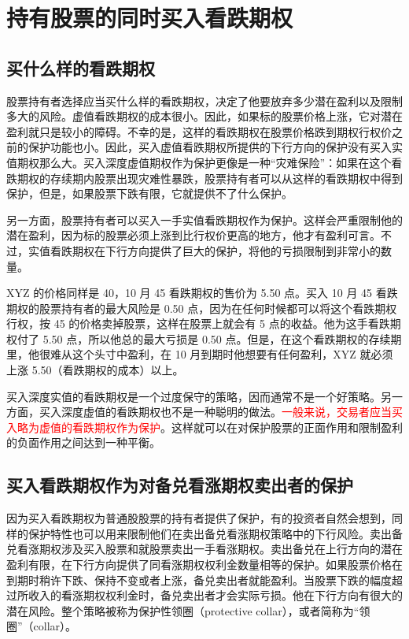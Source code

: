 \chapter{持有股票的同时买入看跌期权\label{CH17}}
\section{买什么样的看跌期权}
股票持有者选择应当买什么样的看跌期权，决定了他要放弃多少潜在盈利以及限制多大的风险。虚值看跌期权的成本很小。因此，如果标的股票价格上涨，它对潜在盈利就只是较小的障碍。不幸的是，这样的看跌期权在股票价格跌到期权行权价之前的保护功能也小。因此，买入虚值看跌期权所提供的下行方向的保护没有买入实值期权那么大。买入深度虚值期权作为保护更像是一种“灾难保险”：如果在这个看跌期权的存续期内股票出现灾难性暴跌，股票持有者可以从这样的看跌期权中得到保护，但是，如果股票下跌有限，它就提供不了什么保护。

另一方面，股票持有者可以买入一手实值看跌期权作为保护。这样会严重限制他的潜在盈利，因为标的股票必须上涨到比行权价更高的地方，他才有盈利可言。不过，实值看跌期权在下行方向提供了巨大的保护，将他的亏损限制到非常小的数量。

\begin{tcolorbox}
    XYZ 的价格同样是 40，10 月 45 看跌期权的售价为 5.50 点。买入 10 月 45 看跌期权的股票持有者的最大风险是 0.50 点，因为在任何时候都可以将这个看跌期权行权，按 45 的价格卖掉股票，这样在股票上就会有 5 点的收益。他为这手看跌期权付了 5.50 点，所以他总的最大亏损是 0.50 点。但是，在这个看跌期权的存续期里，他很难从这个头寸中盈利，在 10 月到期时他想要有任何盈利，XYZ 就必须上涨 5.50（看跌期权的成本）以上。
\end{tcolorbox}

买入深度实值的看跌期权是一个过度保守的策略，因而通常不是一个好策略。另一方面，买入深度虚值的看跌期权也不是一种聪明的做法。\textcolor{red}{一般来说，交易者应当买入略为虚值的看跌期权作为保护}。这样就可以在对保护股票的正面作用和限制盈利的负面作用之间达到一种平衡。
\section{买入看跌期权作为对备兑看涨期权卖出者的保护}
因为买入看跌期权为普通股股票的持有者提供了保护，有的投资者自然会想到，同样的保护特性也可以用来限制他们在卖出备兑看涨期权策略中的下行风险。卖出备兑看涨期权涉及买入股票和就股票卖出一手看涨期权。卖出备兑在上行方向的潜在盈利有限，在下行方向提供了同看涨期权权利金数量相等的保护。如果股票价格在到期时稍许下跌、保持不变或者上涨，备兑卖出者就能盈利。当股票下跌的幅度超过所收入的看涨期权权利金时，备兑卖出者才会实际亏损。他在下行方向有很大的潜在风险。整个策略被称为保护性领圈（protective collar），或者简称为“领圈”（collar）。

